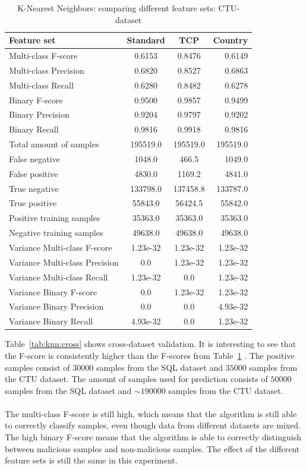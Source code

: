 \begin{table}[H]
\caption{K-Nearest Neighbors: comparing different feature sets: CTU-dataset}
\label{tab:knn:ctu}
\centering
\begin{tabular}{l c c r}
\toprule
Feature set & Standard & TCP & Country \\
\midrule
Multi-class F-score & 0.6153 & 0.8476 & 0.6149 \\
Multi-class Precision & 0.6820 & 0.8527 & 0.6863 \\
Multi-class Recall & 0.6280 & 0.8482 & 0.6278 \\
\midrule
Binary F-score & 0.9500 & 0.9857 & 0.9499\\
Binary Precision & 0.9204 & 0.9797 & 0.9202 \\
Binary Recall & 0.9816 & 0.9918 & 0.9816\\
\midrule
Total amount of samples & 195519.0 & 195519.0 & 195519.0 \\
False negative & 1048.0 & 466.5 & 1049.0 \\
False positive & 4830.0 & 1169.2 & 4841.0 \\
True negative & 133798.0 & 137458.8 & 133787.0 \\
True positive & 55843.0 & 56424.5 & 55842.0 \\
\midrule
Positive training samples & 35363.0 & 35363.0 & 35363.0\\
Negative training samples & 49638.0 & 49638.0 & 49638.0\\
\midrule
Variance Multi-class F-score & 1.23e-32 & 1.23e-32 & 1.23e-32 \\
Variance Multi-class Precision & 0.0 & 1.23e-32 & 1.23e-32 \\
Variance Multi-class Recall & 1.23e-32 & 0.0 & 1.23e-32 \\
\midrule
Variance Binary F-score & 0.0 & 1.23e-32 & 1.23e-32 \\
Variance Binary Precision & 0.0 & 0.0 & 4.93e-32 \\
Variance Binary Recall & 4.93e-32 & 0.0 & 1.23e-32 \\
\bottomrule
\end{tabular}
\end{table}

\noindent Table~\ref{tab:knn:cross} shows cross-dataset validation. It is interesting to see that the F-score is consistently higher than the F-scores from Table~\ref{tab:knn:ctu} . The positive samples consist of $30000$ samples from the SQL dataset and $35000$ samples from the CTU dataset. The amount of samples used for prediction consists of $50000$ samples from the SQL dataset and $\sim190000$ samples from the CTU dataset. \\
\\
The multi-class F-score is still high, which means that the algorithm is still able to correctly classify samples, even though data from different datasets are mixed. The high binary F-score means that the algorithm is able to correctly distinguish between malicious samples and non-malicious samples. The effect of the different feature sets is still the same in this experiment.  

